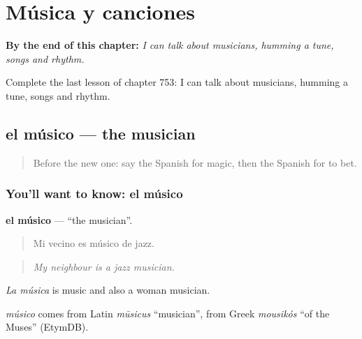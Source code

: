 
\chapter{Música y canciones}
\label{ch:es-musica-y-canciones}

\begin{chapteropening}
\textbf{By the end of this chapter:} \emph{I can talk about musicians, humming a tune, songs and rhythm.}

Complete the last lesson of chapter 753: I can talk about musicians, humming a tune, songs and rhythm.
\end{chapteropening}

\section[el músico]{el músico — the musician}

\label{lesson:ES-C753-musico}



\begin{quote}
Before the new one: say the Spanish for magic, then the Spanish for to bet.
\end{quote}

\subsection*{You'll want to know: el músico}
\textbf{el músico} — \textquotedblleft{}the musician\textquotedblright{}.

\begin{quote}
Mi vecino es músico de jazz.
\end{quote}

\begin{quote}
\emph{My neighbour is a jazz musician.}
\end{quote}

\emph{La música} is music and also a woman musician.

\begin{cousinweb}
\emph{músico} comes from Latin \emph{mūsicus} \textquotedblleft{}musician\textquotedblright{}, from Greek \emph{mousikós} \textquotedblleft{}of the Muses\textquotedblright{} (EtymDB).
\end{cousinweb}

